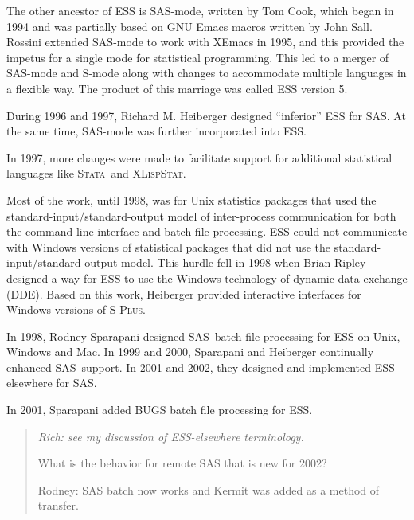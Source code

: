 \documentclass{article}
\newcommand*{\SAS}{\textsc{SAS}}
\newcommand*{\Splus}{\textsc{S-Plus}}
\newcommand*{\XLispStat}{\textsc{XLispStat}}
\newcommand*{\Stata}{\textsc{Stata}}
\newenvironment{Comment}{\begin{quote}\small\itshape }{\end{quote}}
\begin{document}
The other ancestor of ESS is SAS-mode, written by Tom Cook, which
began in 1994 and was partially based on GNU Emacs macros written by
John Sall.
Rossini extended SAS-mode to work with XEmacs in 1995, and this provided the
impetus for a single mode for statistical programming.
This led to a merger of SAS-mode and S-mode along with changes
to accommodate multiple languages in a flexible way.  The product of this
marriage was called ESS version 5.

During 1996 and 1997, Richard M. Heiberger designed ``inferior'' ESS for \SAS.
At the same time, SAS-mode was further incorporated into ESS.

In 1997, more changes were made to facilitate
support for additional statistical languages like \Stata\ and \XLispStat.

Most of the work, until 1998, was for Unix statistics
packages that used the standard-input/standard-output model of inter-process
communication for both the command-line interface and batch file
processing.  ESS could not communicate
with Windows versions of statistical packages that did not
use the standard-input/standard-output model.  This hurdle
fell in 1998 when Brian Ripley designed a way for ESS to use
the Windows technology of dynamic data exchange (DDE).
Based on this work, Heiberger provided interactive interfaces
for Windows versions of \Splus.

In 1998, Rodney Sparapani designed \SAS\ batch file processing for ESS
on Unix, Windows and Mac.  In 1999 and 2000, Sparapani and Heiberger
continually enhanced \SAS\ support. 
In 2001 and 2002, they designed and implemented ESS-elsewhere for \SAS.  

In 2001, Sparapani added BUGS batch file processing for ESS.



\begin{Comment}
Rich: see my discussion of ESS-elsewhere terminology.

What is the behavior for remote SAS that is new for 2002?

Rodney: SAS batch now works and Kermit was added as a method of transfer.
\end{Comment}
\end{document}

